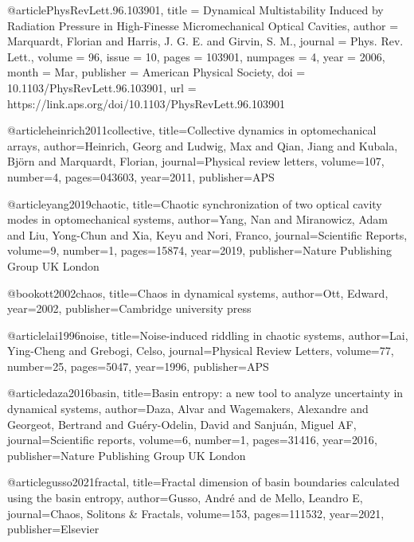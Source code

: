 @article{PhysRevLett.96.103901,
  title = {Dynamical Multistability Induced by Radiation Pressure in High-Finesse Micromechanical Optical Cavities},
  author = {Marquardt, Florian and Harris, J. G. E. and Girvin, S. M.},
  journal = {Phys. Rev. Lett.},
  volume = {96},
  issue = {10},
  pages = {103901},
  numpages = {4},
  year = {2006},
  month = {Mar},
  publisher = {American Physical Society},
  doi = {10.1103/PhysRevLett.96.103901},
  url = {https://link.aps.org/doi/10.1103/PhysRevLett.96.103901}
}



@article{heinrich2011collective,
  title={Collective dynamics in optomechanical arrays},
  author={Heinrich, Georg and Ludwig, Max and Qian, Jiang and Kubala, Bj{\"o}rn and Marquardt, Florian},
  journal={Physical review letters},
  volume={107},
  number={4},
  pages={043603},
  year={2011},
  publisher={APS}
}

@article{yang2019chaotic,
  title={Chaotic synchronization of two optical cavity modes in optomechanical systems},
  author={Yang, Nan and Miranowicz, Adam and Liu, Yong-Chun and Xia, Keyu and Nori, Franco},
  journal={Scientific Reports},
  volume={9},
  number={1},
  pages={15874},
  year={2019},
  publisher={Nature Publishing Group UK London}
}

@book{ott2002chaos,
  title={Chaos in dynamical systems},
  author={Ott, Edward},
  year={2002},
  publisher={Cambridge university press}
}

@article{lai1996noise,
  title={Noise-induced riddling in chaotic systems},
  author={Lai, Ying-Cheng and Grebogi, Celso},
  journal={Physical Review Letters},
  volume={77},
  number={25},
  pages={5047},
  year={1996},
  publisher={APS}
}


@article{daza2016basin,
  title={Basin entropy: a new tool to analyze uncertainty in dynamical systems},
  author={Daza, Alvar and Wagemakers, Alexandre and Georgeot, Bertrand and Gu{\'e}ry-Odelin, David and Sanju{\'a}n, Miguel AF},
  journal={Scientific reports},
  volume={6},
  number={1},
  pages={31416},
  year={2016},
  publisher={Nature Publishing Group UK London}
}

@article{gusso2021fractal,
  title={Fractal dimension of basin boundaries calculated using the basin entropy},
  author={Gusso, Andr{\'e} and de Mello, Leandro E},
  journal={Chaos, Solitons \& Fractals},
  volume={153},
  pages={111532},
  year={2021},
  publisher={Elsevier}
}








